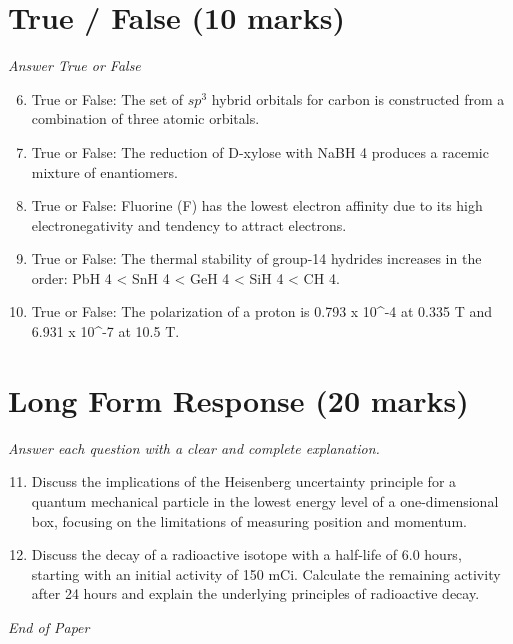 \documentclass[12pt]{article}
\begin{document}
\section*{True / False (10 marks)}
\textit{Answer True or False}
\begin{enumerate}[label=\arabic*.]
\setcounter{enumi}{5}
\item True or False: The set of $sp^3$ hybrid orbitals for carbon is constructed from a combination of three atomic orbitals.
\item True or False: The reduction of D-xylose with NaBH 4 produces a racemic mixture of enantiomers.
\item True or False: Fluorine (F) has the lowest electron affinity due to its high electronegativity and tendency to attract electrons.
\item True or False: The thermal stability of group-14 hydrides increases in the order: PbH 4 \textless{} SnH 4 \textless{} GeH 4 \textless{} SiH 4 \textless{} CH 4.
\item True or False: The polarization of a proton is 0.793 x 10^-4 at 0.335 T and 6.931 x 10^-7 at 10.5 T.
\end{enumerate}

\section*{Long Form Response (20 marks)}
\textit{Answer each question with a clear and complete explanation.}
\begin{enumerate}[label=\arabic*.]
\setcounter{enumi}{10}
\item Discuss the implications of the Heisenberg uncertainty principle for a quantum mechanical particle in the lowest energy level of a one-dimensional box, focusing on the limitations of measuring position and momentum.
\item Discuss the decay of a radioactive isotope with a half-life of 6.0 hours, starting with an initial activity of 150 mCi. Calculate the remaining activity after 24 hours and explain the underlying principles of radioactive decay.
\end{enumerate}

\vfill
\noindent\textit{End of Paper}
\end{document}
